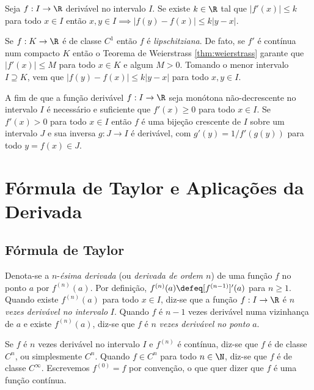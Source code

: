 \documentclass{article}
\begin{document}
\begin{cor}
    Seja \(f: I \to \R\) derivável no intervalo \(I\). Se existe \(k \in \R\) tal que \(\vert f'(x) \vert \leq k\) para todo \(x \in I\) então \(x, y \in I \implies \vert f(y)-f(x) \vert \leq k\vert y-x \vert\).
\end{cor}

\begin{rem}
    Se \(f: K \to \R\) é de classe \(C^1\) então \(f\) é \emph{lipschitziana}. De fato, se \(f'\) é contínua num compacto \(K\) então o Teorema de Weierstrass \eqref{thm:weierstrass} garante que \(\vert f'(x) \vert \leq M\) para todo \(x \in K\) e algum \(M > 0\). Tomando o menor intervalo \(I \supseteq K\), vem que \(\vert f(y)-f(x) \vert \leq k\vert y-x \vert\) para todo \(x, y \in I\).
\end{rem}

\begin{cor}
    A fim de que a função derivável \(f: I \to \R\) seja monótona não-decrescente no intervalo \(I\) é necessário e suficiente que \(f'(x) \geq 0\) para todo \(x \in I\).
    Se \(f'(x) > 0\) para todo \(x \in I\) então \(f\) é uma bijeção crescente de \(I\) sobre um intervalo \(J\) e sua inversa \(g: J \to I\) é derivável, com \(g'(y) = 1 / f'(g(y))\) para todo \(y = f(x) \in J\).
\end{cor}

\section{Fórmula de Taylor e Aplicações da Derivada}

\subsection{Fórmula de Taylor}

\begin{defn}
    Denota-se a \(n\)-\emph{ésima derivada} (ou \emph{derivada de ordem \(n\)}) de uma função \(f\) no ponto \(a\) por \(f^{(n)}(a)\). Por definição, \(f^{(n)}(a) \defeq [f^{(n-1)}]'(a)\) para \(n \geq 1\).
    Quando existe \(f^{(n)}(a)\) para todo \(x \in I\), diz-se que a função \(f: I \to \R\) é \(n\) \emph{vezes derivável no intervalo} \(I\). Quando \(f\) é \(n-1\) vezes derivável numa vizinhança de \(a\) e existe \(f^{(n)}(a)\), diz-se que \(f\) é \(n\) \emph{vezes derivável no ponto} \(a\).

    Se \(f\) é \(n\) vezes derivável no intervalo \(I\) e \(f^{(n)}\) é contínua, diz-se que \(f\) é de classe \(C^n\), ou simplesmente \(C^n\). Quando \(f \in C^n\) para todo \(n \in \N\), diz-se que \(f\) é de classe \(C^\infty\). Escrevemos \(f^{(0)} = f\) por convenção, o que quer dizer que \(f\) é uma função contínua.
\end{defn}
\end{document}
